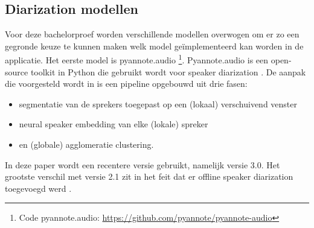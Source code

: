 \subsection{Diarization modellen}
Voor deze bachelorproef worden verschillende modellen overwogen om er zo een gegronde keuze te kunnen maken welk model geïmplementeerd kan worden in de applicatie. Het eerste model is pyannote.audio \footnote{Code pyannote.audio: \url{https://github.com/pyannote/pyannote-audio}}. Pyannote.audio is een open-source toolkit in Python die gebruikt wordt voor speaker diarization \autocite{Bredin2023}. De aanpak die voorgesteld wordt in \textcite{Bredin2023} is een pipeline opgebouwd uit drie fasen:
\begin{itemize}
	\item segmentatie van de sprekers toegepast op een (lokaal) verschuivend venster
	\item neural speaker embedding van elke (lokale) spreker
	\item en (globale) agglomeratie clustering.
\end{itemize}
In deze paper wordt een recentere versie gebruikt, namelijk versie 3.0. Het grootste verschil met versie 2.1 zit in het feit dat er offline speaker diarization toegevoegd werd \textcite{Bredin2024}.

